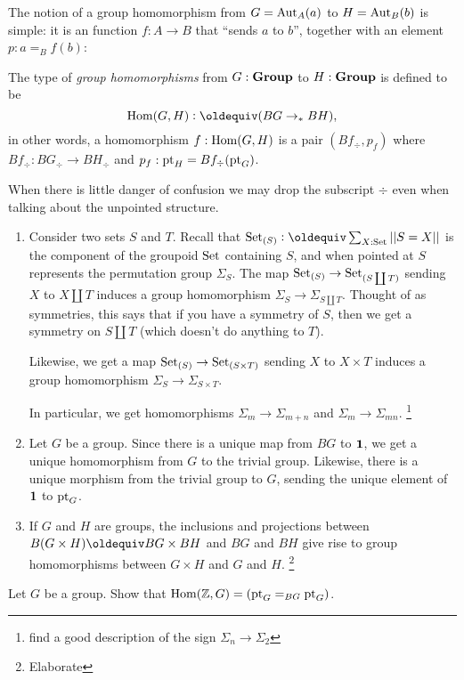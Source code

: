 The notion of a group homomorphism from $G=\mathrm{Aut}_A(a)$ to $H=\mathrm{Aut}_B(b)$ is simple: it is an function $f:A\to B$ that ``sends $a$ to $b$'', \ie together with an element $p:a=_Bf(b)$:
\begin{definition}\label{def:grouphomomorphism}
  The type of \emph{group homomorphisms} from $G:\mathbf{Group}$ to $H:\mathbf{Group}$ is defined to be
$$\Hom(G,H)\defequi(BG\to_* BH),
$$
in other words, a homomorphism $f:\mathrm{Hom}(G,H)$ is a pair $(Bf_\div,p_f)$ where $Bf_\div:BG_\div\to BH_\div$ and $p_f:{\mathord{\mathrm{pt}}}_H=Bf_\div({\mathord{\mathrm{pt}}}_G)$.
\end{definition}
When there is little danger of confusion we may drop the subscript $\div$ even when talking about the unpointed structure.
\begin{example}
  \begin{enumerate}
  \item   Consider two sets $S$ and $T$.  
Recall that $\Set_{(S)}\defequi\sum_{X:\Set}||S=X||$ is the component of the groupoid $\mathord{\mathrm{Set}}$ containing $S$, and when pointed at $S$ represents the permutation group $\Sigma_S$.  
The map $\mathord{\mathrm{Set}}_{(S)}\to\mathord{\mathrm{Set}}_{(S\coprod T)}$ sending $X$ to $X\coprod T$ induces a group homomorphism $\Sigma_S\to\Sigma_{S\coprod T}$.
Thought of as symmetries, this says that if you have a symmetry of $S$, then we get a symmetry on $S\coprod T$ (which doesn't do anything to $T$).  

Likewise, we get a map $\mathord{\mathrm{Set}}_{(S)}\to\mathord{\mathrm{Set}}_{(S\times T)}$ sending $X$ to $X\times T$ induces a group homomorphism $\Sigma_S\to\Sigma_{S\times T}$. 

In particular, we get homomorphisms $\Sigma_m\to\Sigma_{m+n}$ and $\Sigma_m\to\Sigma_{mn}$. \footnote{find a good description of the sign $\Sigma_n\to\Sigma_2$}
\item Let $G$ be a group.  Since there is a unique map from $BG$ to $\mathbf{1} $, we get a unique homomorphism from $G$ to the trivial group.  
Likewise, there is a unique morphism from the trivial group to $G$, sending the unique element of $\mathbf{1}$ to ${\mathord{\mathrm{pt}}}_G$. 
\item If $G$ and $H$ are groups, the inclusions and projections between $B(G\times H)\oldequiv BG\times BH$ and $BG$ and $BH$ give rise to group homomorphisms between $G\times H$ and $G$ and $H$.  \footnote{Elaborate}
  \end{enumerate}
\end{example}
\begin{xca}
  Let $G$ be a group.  Show that $\mathrm{Hom}(\mathbb{Z},G)=({\mathord{\mathrm{pt}}}_G=_{BG}{\mathord{\mathrm{pt}}}_G)$.  %
\end{xca}
